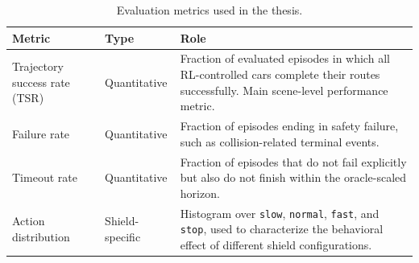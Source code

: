 \begin{table}[H]
\centering
\small
\caption{Evaluation metrics used in the thesis.}
\label{tab:evaluation-metrics}
\begin{tabularx}{\linewidth}{@{}l l X@{}}
\toprule
\textbf{Metric} & \textbf{Type} & \textbf{Role} \\
\midrule
Trajectory success rate (TSR) & Quantitative & Fraction of evaluated episodes in which all RL-controlled cars complete their routes successfully. Main scene-level performance metric. \\
\addlinespace
Failure rate & Quantitative & Fraction of episodes ending in safety failure, such as collision-related terminal events. \\
\addlinespace
Timeout rate & Quantitative & Fraction of episodes that do not fail explicitly but also do not finish within the oracle-scaled horizon. \\
\addlinespace
Action distribution & Shield-specific & Histogram over \texttt{slow}, \texttt{normal}, \texttt{fast}, and \texttt{stop}, used to characterize the behavioral effect of different shield configurations. \\
\bottomrule
\end{tabularx}
\end{table}
